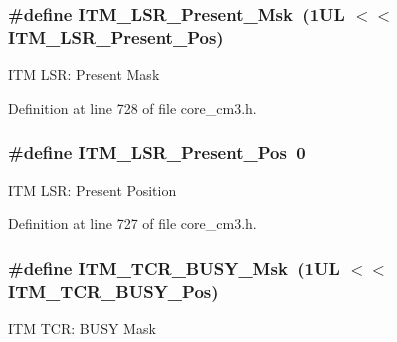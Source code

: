\subsubsection[{\texorpdfstring{I\+T\+M\+\_\+\+L\+S\+R\+\_\+\+Present\+\_\+\+Msk}{ITM_LSR_Present_Msk}}]{\setlength{\rightskip}{0pt plus 5cm}\#define I\+T\+M\+\_\+\+L\+S\+R\+\_\+\+Present\+\_\+\+Msk~(1\+U\+L $<$$<$ I\+T\+M\+\_\+\+L\+S\+R\+\_\+\+Present\+\_\+\+Pos)}\hypertarget{group__CMSIS__ITM_gaa5bc2a7f5f1d69ff819531f5508bb017}{}\label{group__CMSIS__ITM_gaa5bc2a7f5f1d69ff819531f5508bb017}
I\+TM L\+SR\+: Present Mask 

Definition at line 728 of file core\+\_\+cm3.\+h.

\subsubsection[{\texorpdfstring{I\+T\+M\+\_\+\+L\+S\+R\+\_\+\+Present\+\_\+\+Pos}{ITM_LSR_Present_Pos}}]{\setlength{\rightskip}{0pt plus 5cm}\#define I\+T\+M\+\_\+\+L\+S\+R\+\_\+\+Present\+\_\+\+Pos~0}\hypertarget{group__CMSIS__ITM_gaf5740689cf14564d3f3fd91299b6c88d}{}\label{group__CMSIS__ITM_gaf5740689cf14564d3f3fd91299b6c88d}
I\+TM L\+SR\+: Present Position 

Definition at line 727 of file core\+\_\+cm3.\+h.

\subsubsection[{\texorpdfstring{I\+T\+M\+\_\+\+T\+C\+R\+\_\+\+B\+U\+S\+Y\+\_\+\+Msk}{ITM_TCR_BUSY_Msk}}]{\setlength{\rightskip}{0pt plus 5cm}\#define I\+T\+M\+\_\+\+T\+C\+R\+\_\+\+B\+U\+S\+Y\+\_\+\+Msk~(1\+U\+L $<$$<$ I\+T\+M\+\_\+\+T\+C\+R\+\_\+\+B\+U\+S\+Y\+\_\+\+Pos)}\hypertarget{group__CMSIS__ITM_ga43ad7cf33de12f2ef3a412d4f354c60f}{}\label{group__CMSIS__ITM_ga43ad7cf33de12f2ef3a412d4f354c60f}
I\+TM T\+CR\+: B\+U\+SY Mask 

